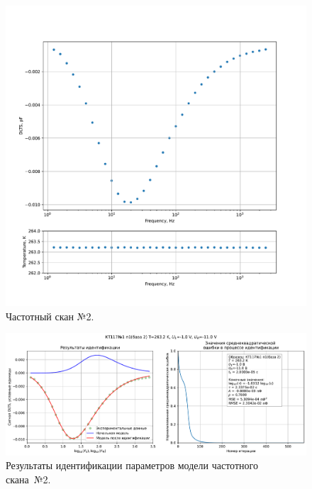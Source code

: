 \begin{figure}[!ht]
    \centering
    \includegraphics[width=1\textwidth]{../plots/КТ117№1_п1(база 2)_2500Гц-1Гц_1пФ_-10С_-1В-11В_200мВ_20мкс_шаг_0,1.pdf}
    \caption{Частотный скан №2.}
    \label{pic:frequency_scan_2}
\end{figure}

\begin{figure}[!ht]
    \centering
    \includegraphics[width=1\textwidth]{../plots/КТ117№1_п1(база 2)_2500Гц-1Гц_1пФ_-10С_-1В-11В_200мВ_20мкс_шаг_0,1_model.pdf}
    \caption{Результаты идентификации параметров модели частотного скана~№2.}
    \label{pic:frequency_scan_model2}
\end{figure}

\pagebreak


